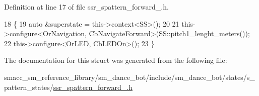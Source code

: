Definition at line 17 of file ssr\+\_\+spattern\+\_\+forward\+\_.\+h.


\begin{DoxyCode}
18   \{
19     \textcolor{keyword}{auto} &superstate = this->context<SS>();
20 
21     this->configure<OrNavigation, CbNavigateForward>(SS::pitch1\_lenght\_meters());
22     this->configure<OrLED, CbLEDOn>();
23   \}
\end{DoxyCode}


The documentation for this struct was generated from the following file\+:\begin{DoxyCompactItemize}
\item 
smacc\+\_\+sm\+\_\+reference\+\_\+library/sm\+\_\+dance\+\_\+bot/include/sm\+\_\+dance\+\_\+bot/states/s\+\_\+pattern\+\_\+states/\hyperlink{ssr__spattern__forward__4_8h}{ssr\+\_\+spattern\+\_\+forward\+\_.\+h}\end{DoxyCompactItemize}
